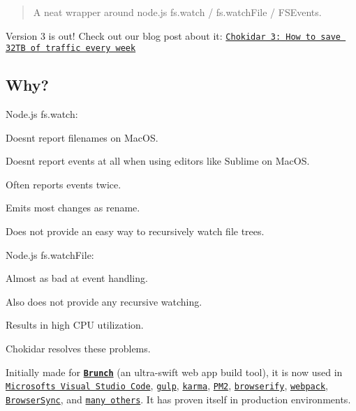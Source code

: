 \begin{quote}
A neat wrapper around node.\+js fs.\+watch / fs.\+watch\+File / F\+S\+Events. \end{quote}


\href{https://www.npmjs.com/package/chokidar}{\tt }

Version 3 is out! Check out our blog post about it\+: \href{https://paulmillr.com/posts/chokidar-3-save-32tb-of-traffic/}{\tt Chokidar 3\+: How to save 32\+TB of traffic every week}

\subsection*{Why?}

Node.\+js {\ttfamily fs.\+watch}\+:


\begin{DoxyItemize}
\item Doesn\textquotesingle{}t report filenames on Mac\+OS.
\item Doesn\textquotesingle{}t report events at all when using editors like Sublime on Mac\+OS.
\item Often reports events twice.
\item Emits most changes as {\ttfamily rename}.
\item Does not provide an easy way to recursively watch file trees.
\end{DoxyItemize}

Node.\+js {\ttfamily fs.\+watch\+File}\+:


\begin{DoxyItemize}
\item Almost as bad at event handling.
\item Also does not provide any recursive watching.
\item Results in high C\+PU utilization.
\end{DoxyItemize}

Chokidar resolves these problems.

Initially made for {\bfseries \href{http://brunch.io}{\tt Brunch}} (an ultra-\/swift web app build tool), it is now used in \href{https://github.com/microsoft/vscode}{\tt Microsoft\textquotesingle{}s Visual Studio Code}, \href{https://github.com/gulpjs/gulp/}{\tt gulp}, \href{http://karma-runner.github.io}{\tt karma}, \href{https://github.com/Unitech/PM2}{\tt P\+M2}, \href{http://browserify.org/}{\tt browserify}, \href{http://webpack.github.io/}{\tt webpack}, \href{http://www.browsersync.io/}{\tt Browser\+Sync}, and \href{https://www.npmjs.org/browse/depended/chokidar/}{\tt many others}. It has proven itself in production environments.

